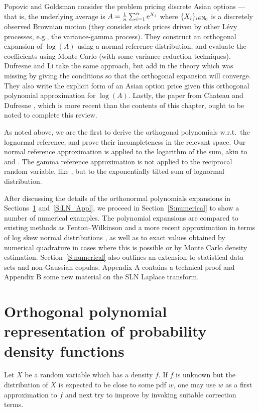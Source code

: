 Popovic and Goldsman \cite{popovic2012easy} consider the problem pricing discrete Asian options --- that is, the underlying average is $A = \frac1n \sum_{i=1}^n \mathrm{e}^{X_i}$ where $\{X_i\}_{i\in\mathbb{N}_0}$ is a discretely observed Brownian motion (they consider stock prices driven by other L{\'e}vy processes, e.g., the variance-gamma process). They construct an orthogonal expansion of $\log(A)$ using a normal reference distribution, and evaluate the coefficients using Monte Carlo (with some variance reduction techniques). Dufresne and Li \cite{dufresne2016pricing} take the same approach, but add in the theory which was missing by giving the conditions so that the orthogonal expansion will converge. They also write the explicit form of an Asian option price given this orthogonal polynomial approximation for $\log(A)$. Lastly, the paper from Chateau and Dufresne \cite{chateau2017gram}, which is more recent than the contents of this chapter, ought to be noted to complete this review.

As noted above, we are the first to derive the orthogonal polynomials w.r.t.\ the lognormal reference, and prove their incompleteness in the relevant space. Our normal reference approximation is applied to the logarithm of the sum, akin to \cite{popovic2012easy} and \cite{dufresne2016pricing}. The gamma reference approximation is not applied to the reciprocal random variable, like \cite{dufresne2000laguerre}, but to the exponentially tilted sum of lognormal distribution.

After discussing the details of the orthonormal polynomials expansions in Sections~\ref{S:OrthPol} and~\ref{S:LN_Appl},
we proceed in Section~\ref{S:numerical} to show a number of numerical examples. The polynomial expansions
are compared to existing methods as Fenton--Wilkinson and a more recent approximation in terms of log skew normal
distributions \cite{hcine2015highly}, as well as to exact values obtained by numerical quadrature in cases where this
is possible or by Monte Carlo density estimation. Section~\ref{S:numerical} also outlines an extension to  statistical data sets and non-Gaussian copulas. Appendix A contains a technical proof
and Appendix B some new material on the SLN Laplace transform.

\section{Orthogonal polynomial representation of probability density functions}
\label{S:OrthPol}

Let $X$ be a random variable which has a density $f$. If $f$ is unknown but the distribution of $X$ is
expected to be close to some pdf $w$, one may use $w$ as a first approximation to $f$ and next try
to improve by invoking suitable correction terms.

